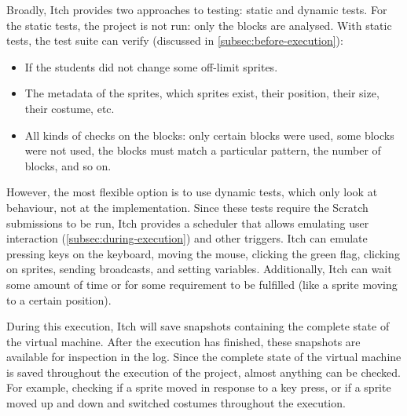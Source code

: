\documentclass[../main]{subfiles}
\begin{document}
Broadly, Itch provides two approaches to testing: static and dynamic tests.
For the static tests, the project is not run: only the blocks are analysed.
With static tests, the test suite can verify (discussed in \cref{subsec:before-execution}):

\begin{itemize}[noitemsep]
    \item If the students did not change some off-limit sprites.
    \item The metadata of the sprites, which sprites exist, their position, their size, their costume, etc.
    \item All kinds of checks on the blocks: only certain blocks were used, some blocks were not used, the blocks must match a particular pattern, the number of blocks, and so on.
\end{itemize}

However, the most flexible option is to use dynamic tests, which only look at behaviour, not at the implementation.
Since these tests require the Scratch submissions to be run, Itch provides a scheduler that allows emulating user interaction (\cref{subsec:during-execution}) and other triggers.
Itch can emulate pressing keys on the keyboard, moving the mouse, clicking the green flag, clicking on sprites, sending broadcasts, and setting variables.
Additionally, Itch can wait some amount of time or for some requirement to be fulfilled (like a sprite moving to a certain position).

During this execution, Itch will save snapshots containing the complete state of the virtual machine.
After the execution has finished, these snapshots are available for inspection in the log.
Since the complete state of the virtual machine is saved throughout the execution of the project, almost anything can be checked.
For example, checking if a sprite moved in response to a key press, or if a sprite moved up and down and switched costumes throughout the execution.
\end{document}
